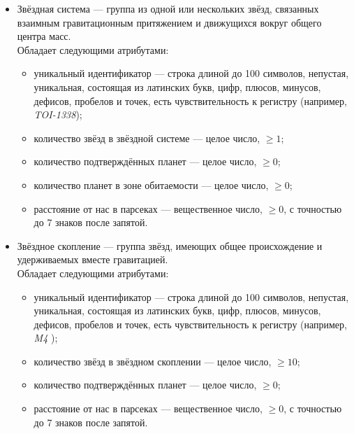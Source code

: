 \documentclass[14pt,a4paper]{extarticle}
\begin{document}
\begin{itemize}
		\item Звёздная система --- группа из одной или нескольких звёзд, связанных взаимным гравитационным притяжением и движущихся вокруг общего центра масс.\\
		Обладает следующими атрибутами:
		\begin{itemize}
			\item уникальный идентификатор --- строка длиной до 100 символов, непустая, уникальная, состоящая из латинских букв, цифр, плюсов, минусов, дефисов, пробелов и точек, есть чувствительность к регистру (например, \textit{TOI-1338});
			\item количество звёзд в звёздной системе --- целое число, $\geq 1$;
			\item количество подтверждённых планет --- целое число, $\geq 0$;
			\item количество планет в зоне обитаемости --- целое число, $\geq 0$;
			\item расстояние от нас в парсеках --- вещественное число, $\geq 0$, с точностью до 7 знаков после запятой.
		\end{itemize}
		
		\item Звёздное скопление --- группа звёзд, имеющих общее происхождение и удерживаемых вместе гравитацией.\\
		Обладает следующими атрибутами:
		\begin{itemize}
			\item уникальный идентификатор --- строка длиной до 100 символов, непустая, уникальная, состоящая из латинских букв, цифр, плюсов, минусов, дефисов, пробелов и точек, есть чувствительность к регистру (например, \textit{M4} \cite{M4});
			\item количество звёзд в звёздном скоплении --- целое число, $\geq 10$;
			\item количество подтверждённых планет --- целое число, $\geq 0$;
			\item расстояние от нас в парсеках --- вещественное число, $\geq 0$, с точностью до 7 знаков после запятой.
		\end{itemize}
		
		
		

\end{itemize}
\end{document}
